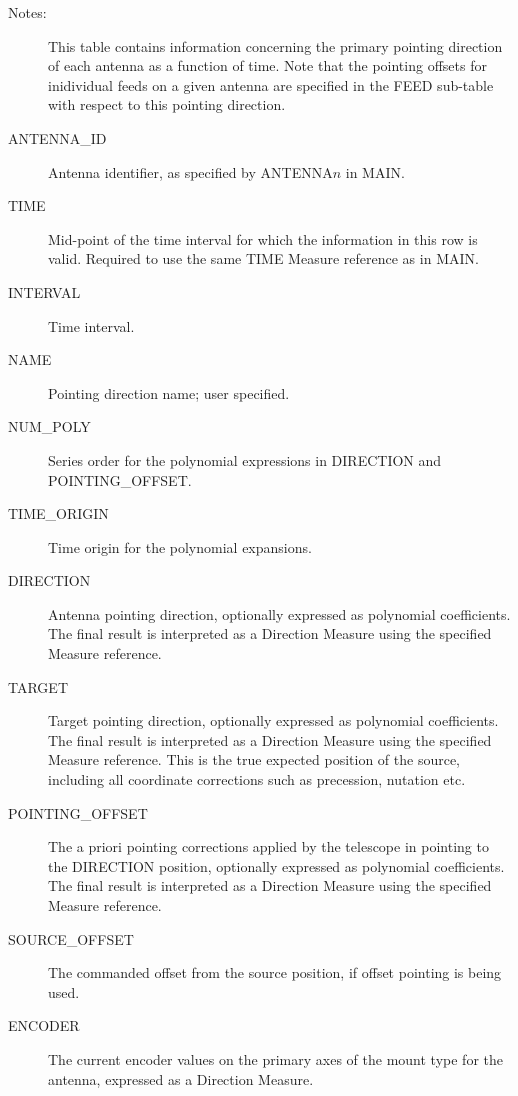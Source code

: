 \documentclass{article}
\begin{document}
\begin{itemize}
\begin{description}
\item[Notes:] This table contains information concerning the primary
pointing direction of each antenna as a function of time. Note that
the pointing offsets for inidividual feeds on a given antenna are
specified in the FEED sub-table with respect to this pointing direction.

\item[ANTENNA\_ID] Antenna identifier, as specified by ANTENNA$n$ in MAIN.

\item[TIME] Mid-point of the time interval for which the information
in this row is valid. Required to use the same TIME Measure reference
as in MAIN.

\item[INTERVAL] Time interval.

\item[NAME] Pointing direction name; user specified.

\item[NUM\_POLY] Series order for the polynomial expressions in
DIRECTION and POINTING\_OFFSET.

\item[TIME\_ORIGIN] Time origin for the polynomial expansions.

\item[DIRECTION] Antenna pointing direction, optionally expressed as
polynomial coefficients. The final result is interpreted as a
Direction Measure using the specified Measure reference. 

\item[TARGET] Target pointing direction, optionally expressed as
polynomial coefficients. The final result is interpreted as a
Direction Measure using the specified Measure reference. This is the
true expected position of the source, including all coordinate
corrections such as precession, nutation etc.

\item[POINTING\_OFFSET] The a priori pointing corrections applied by
the telescope in pointing to the DIRECTION position, optionally
expressed as polynomial coefficients. The final result is interpreted
as a Direction Measure using the specified Measure reference.

\item[SOURCE\_OFFSET] The commanded offset from the source position,
if offset pointing is being used.

\item[ENCODER] The current encoder values on the primary axes of the
mount type for the antenna, expressed as a Direction Measure.


\end{description}
\end{itemize}
\end{document}
